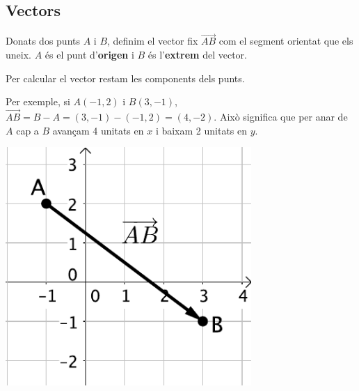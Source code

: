 \subsection{Vectors}
\vspace{-0.25cm}
\begin{theorybox}
	\begin{minipage}{0.6\textwidth}
			Donats dos punts $A$ i $B$, definim el vector fix $\overrightarrow{AB}$ com el segment orientat que els uneix. $A$ és el punt d'\textbf{origen} i $B$ és l'\textbf{extrem} del vector.
		
		Per calcular el vector restam les components dels punts. 
		
		Per exemple, si $A(-1, 2)$ i $B(3, -1)$, $\overrightarrow{AB}=B-A =(3, -1)-(-1, 2)=(4, -2)$. Això significa que per anar de $A$ cap a $B$ avançam 4 unitats en $x$ i baixam 2 unitats en $y$.
	\end{minipage}
\begin{minipage}{0.4\textwidth}
	\centering
	\includegraphics[width=0.7\textwidth]{img-10/vector-example}
\end{minipage}

\end{theorybox}

